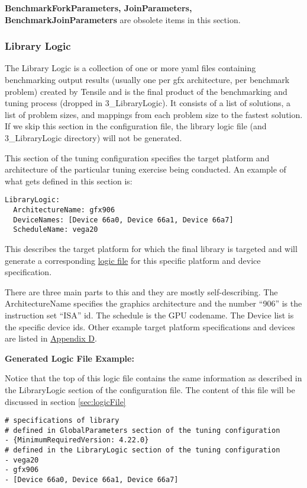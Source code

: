 \documentclass[]{article}
\begin{document}
\textbf{BenchmarkForkParameters, JoinParameters, BenchmarkJoinParameters} are obsolete items in this section. 


\subsubsection{Library Logic}
\label{sec:LibraryLogic}

The Library Logic is a collection of one or more yaml files containing benchmarking output results (usually one per gfx architecture, per benchmark problem) created by Tensile and is the final product of the benchmarking and tuning process (dropped in 3\_LibraryLogic). It consists of a list of solutions, a list of problem sizes, and mappings from each problem size to the fastest solution. If we skip this section in the configuration file, the library logic file (and 3\_LibraryLogic directory) will not be generated.

This section of the tuning configuration specifies the target platform and architecture of the particular tuning exercise being conducted. An example of what gets defined in this section is:

\begin{verbatim}
LibraryLogic:
  ArchitectureName: gfx906
  DeviceNames: [Device 66a0, Device 66a1, Device 66a7]
  ScheduleName: vega20
\end{verbatim}
\noindent
This describes the target platform for which the final library is targeted and will generate a corresponding \hyperref[sec:logicFile]{logic file} for this specific platform and device specification. \newline

\noindent
There are three main parts to this and they are mostly self-describing. The ArchitectureName specifies the graphics architecture and the number ``906'' is the instruction set ``ISA'' id. The schedule is the GPU codename. The Device list is the specific device ids. Other example target platform specifications and devices are listed in \hyperref[sec:appendixD]{Appendix D}. \newline


\noindent \textbf{Generated Logic File Example:}

\noindent
Notice that the top of this logic file contains the same information as described in the LibraryLogic section of the configuration file. The content of this file will be discussed in section \ref{sec:logicFile} \newline
\begin{verbatim}
# specifications of library
# defined in GlobalParameters section of the tuning configuration
- {MinimumRequiredVersion: 4.22.0}
# defined in the LibraryLogic section of the tuning configuration
- vega20
- gfx906
- [Device 66a0, Device 66a1, Device 66a7]
\end{verbatim}
\end{document}
